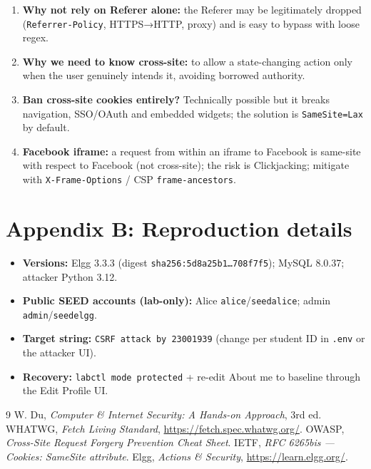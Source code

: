 \documentclass[11pt,a4paper]{article}
\begin{document}
\begin{enumerate}[leftmargin=2.2em]
\item \textbf{Why not rely on Referer alone:} the Referer may be legitimately dropped (\texttt{Referrer-Policy}, HTTPS→HTTP, proxy) and is easy to bypass with loose regex.
\item \textbf{Why we need to know cross-site:} to allow a state-changing action only when the user genuinely intends it, avoiding borrowed authority.
\item \textbf{Ban cross-site cookies entirely?} Technically possible but it breaks navigation, SSO/OAuth and embedded widgets; the solution is \texttt{SameSite=Lax} by default.
\item \textbf{Facebook iframe:} a request from within an iframe to Facebook is same-site with respect to Facebook (not cross-site); the risk is Clickjacking; mitigate with \texttt{X-Frame-Options} / CSP \texttt{frame-ancestors}.
\end{enumerate}

\section{Appendix B: Reproduction details}
\small
\begin{itemize}
  \item \textbf{Versions:} Elgg 3.3.3 (digest \texttt{sha256:5d8a25b1\ldots708f7f5}); MySQL 8.0.37; attacker Python 3.12.
  \item \textbf{Public SEED accounts (lab-only):} Alice \texttt{alice}/\texttt{seedalice}; admin \texttt{admin}/\texttt{seedelgg}.
  \item \textbf{Target string:} \texttt{CSRF attack by 23001939} (change per student ID in \texttt{.env} or the attacker UI).
  \item \textbf{Recovery:} \texttt{labctl mode protected} + re-edit About me to baseline through the Edit Profile UI.
\end{itemize}

\begin{thebibliography}{9}\small
{} W. Du, \emph{Computer \& Internet Security: A Hands-on Approach}, 3rd ed.
 WHATWG, \emph{Fetch Living Standard}, \url{https://fetch.spec.whatwg.org/}.
 OWASP, \emph{Cross-Site Request Forgery Prevention Cheat Sheet}.
 IETF, \emph{RFC 6265bis — Cookies: SameSite attribute}.
 Elgg, \emph{Actions \& Security}, \url{https://learn.elgg.org/}.
\end{thebibliography}
\end{document}
